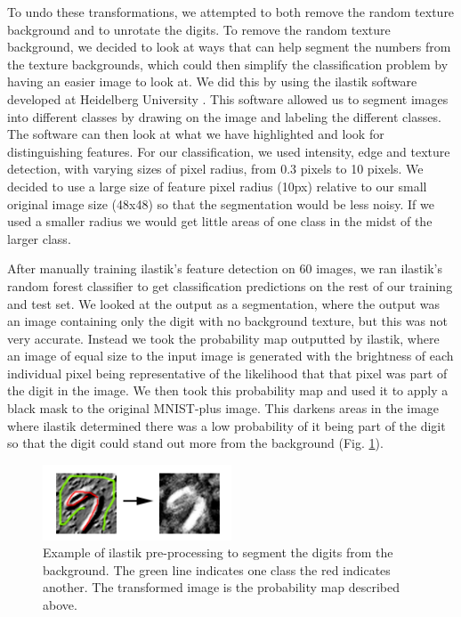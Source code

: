 \documentclass[conference]{IEEEtran}
\begin{document}
To undo these transformations, we attempted to both remove the random texture background and to unrotate the digits. To remove the random texture background, we decided to look at ways that can help segment the numbers from the texture backgrounds, which could then simplify the classification problem by having an easier image to look at. We did this by using the ilastik software developed at Heidelberg University \cite{sommer_11_ilastik}. This software allowed us to segment images into different classes by drawing on the image and labeling the different classes. The software can then look at what we have highlighted and look for distinguishing features. For our classification, we used intensity, edge and texture detection, with varying sizes of pixel radius, from 0.3 pixels to 10 pixels. We decided to use a large size of feature pixel radius (10px) relative to our small original image size (48x48) so that the segmentation would be less noisy. If we used a smaller radius we would get little areas of one class in the midst of the larger class. 

After manually training ilastik’s feature detection on 60 images, we ran ilastik’s random forest classifier to get classification predictions on the rest of our training and test set. We looked at the output as a segmentation, where the output was an image containing only the digit with no background texture, but this was not very accurate. Instead we took the probability map outputted by ilastik, where an image of equal size to the input image is generated with the brightness of each individual pixel being representative of the likelihood that that pixel was part of the digit in the image. We then took this probability map and used it to apply a black mask to the original MNIST-plus image. This darkens areas in the image where ilastik determined there was a low probability of it being part of the digit so that the digit could stand out more from the background (Fig. \ref{ilastik}).

\begin{figure}[H]
\centering
\includegraphics[width=0.5\textwidth]{prob.png}
\caption{\scriptsize Example of ilastik pre-processing to segment the digits from the background. The green line indicates one class the red indicates another. The transformed image is the probability map described above.}
\label{ilastik}
\end{figure}
\end{document}
